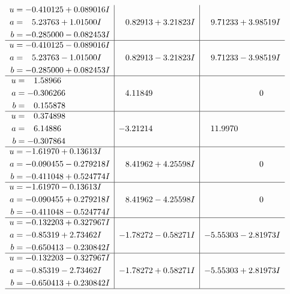 \documentclass[1p]{elsarticle_modified}
\theoremstyle{definition}
\begin{document}
$$\begin{array}{c|c|c}
\begin{aligned}
u &= -0.410125 + 0.089016 I \\
a &= \phantom{-}5.23763 + 1.01500 I \\
b &= -0.285000 - 0.082453 I\end{aligned}
 & \phantom{-}0.82913 + 3.21823 I & \phantom{-}9.71233 + 3.98519 I \\ \hline\begin{aligned}
u &= -0.410125 - 0.089016 I \\
a &= \phantom{-}5.23763 - 1.01500 I \\
b &= -0.285000 + 0.082453 I\end{aligned}
 & \phantom{-}0.82913 - 3.21823 I & \phantom{-}9.71233 - 3.98519 I \\ \hline\begin{aligned}
u &= \phantom{-}1.58966\phantom{ +0.000000I} \\
a &= -0.306266\phantom{ +0.000000I} \\
b &= \phantom{-}0.155878\phantom{ +0.000000I}\end{aligned}
 & \phantom{-}4.11849\phantom{ +0.000000I} & \phantom{-0.000000 } 0 \\ \hline\begin{aligned}
u &= \phantom{-}0.374898\phantom{ +0.000000I} \\
a &= \phantom{-}6.14886\phantom{ +0.000000I} \\
b &= -0.307864\phantom{ +0.000000I}\end{aligned}
 & -3.21214\phantom{ +0.000000I} & \phantom{-}11.9970\phantom{ +0.000000I} \\ \hline\begin{aligned}
u &= -1.61970 + 0.13613 I \\
a &= -0.090455 - 0.279218 I \\
b &= -0.411048 + 0.524774 I\end{aligned}
 & \phantom{-}8.41962 + 4.25598 I & \phantom{-0.000000 } 0 \\ \hline\begin{aligned}
u &= -1.61970 - 0.13613 I \\
a &= -0.090455 + 0.279218 I \\
b &= -0.411048 - 0.524774 I\end{aligned}
 & \phantom{-}8.41962 - 4.25598 I & \phantom{-0.000000 } 0 \\ \hline\begin{aligned}
u &= -0.132203 + 0.327967 I \\
a &= -0.85319 + 2.73462 I \\
b &= -0.650413 - 0.230842 I\end{aligned}
 & -1.78272 - 0.58271 I & -5.55303 - 2.81973 I \\ \hline\begin{aligned}
u &= -0.132203 - 0.327967 I \\
a &= -0.85319 - 2.73462 I \\
b &= -0.650413 + 0.230842 I\end{aligned}
 & -1.78272 + 0.58271 I & -5.55303 + 2.81973 I\\
 \hline 
 \end{array}$$\newpage\newpage\renewcommand{\arraystretch}{1}
\end{document}
